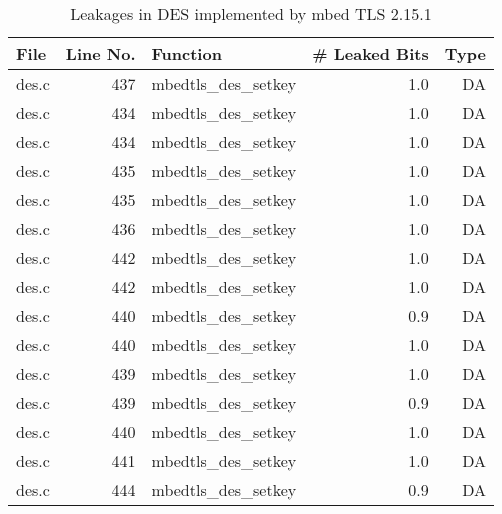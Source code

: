 \begin{table}[!ht]
\centering\tiny\scriptsize
\caption{Leakages in DES implemented by mbed TLS 2.15.1}\label{tab:DESmbed TLS2.15.1}
\begin{tabular}{lrlrr}
\hline
\textbf{File} & \textbf{Line No.} & \textbf{Function} & \textbf{\# Leaked Bits} & \textbf{Type} \\\hline
des.c& 437&mbedtls\_des\_setkey&1.0 &DA\\
des.c& 434&mbedtls\_des\_setkey&1.0 &DA\\
des.c& 434&mbedtls\_des\_setkey&1.0 &DA\\
des.c& 435&mbedtls\_des\_setkey&1.0 &DA\\
des.c& 435&mbedtls\_des\_setkey&1.0 &DA\\
des.c& 436&mbedtls\_des\_setkey&1.0 &DA\\
des.c& 442&mbedtls\_des\_setkey&1.0 &DA\\
des.c& 442&mbedtls\_des\_setkey&1.0 &DA\\
des.c& 440&mbedtls\_des\_setkey&0.9 &DA\\
des.c& 440&mbedtls\_des\_setkey&1.0 &DA\\
des.c& 439&mbedtls\_des\_setkey&1.0 &DA\\
des.c& 439&mbedtls\_des\_setkey&0.9 &DA\\
des.c& 440&mbedtls\_des\_setkey&1.0 &DA\\
des.c& 441&mbedtls\_des\_setkey&1.0 &DA\\
des.c& 444&mbedtls\_des\_setkey&0.9 &DA\\
\hline
\end{tabular}
\renewcommand{\baselinestretch}{1.0}\selectfont
\end{table}
